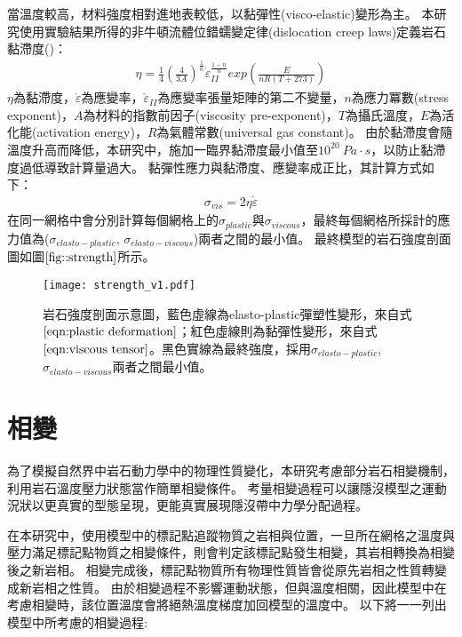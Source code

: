 當溫度較高，材料強度相對進地表較低，以黏彈性(visco-elastic)變形為主。
本研究使用實驗結果所得的非牛頓流體位錯蠕變定律(dislocation creep laws)定義岩石黏滯度(\citealp{Chen1990})：
\begin{align}
   \eta=\frac{1}{4}(\frac{4}{3A})^{\frac{1}{n}} \dot\varepsilon_{II}^{\frac{1-n}{n}} exp(\frac{E}{nR(T+273)})
   \label{eqn:viscousity}
\end{align}
$\eta$為黏滯度，$\dot\varepsilon$為應變率，$\dot\varepsilon_{II}$為應變率張量矩陣的第二不變量，$n$為應力冪數(stress exponent)，$A$為材料的指數前因子(viscosity pre-exponent)，$T$為攝氏溫度，$E$為活化能(activation energy)，$R$為氣體常數(universal gas constant)。
由於黏滯度會隨溫度升高而降低，本研究中，施加一臨界黏滯度最小值至$10^{20}\ Pa\cdot s$，以防止黏滯度過低導致計算量過大。
黏彈性應力與黏滯度、應變率成正比，其計算方式如下：	
\begin{align}
    \sigma_{vis} = 2\eta\dot\varepsilon \label{eqn:viscous tensor}
\end{align}
在同一網格中會分別計算每個網格上的$\sigma_{plastic}$與$\sigma_{viscous}$，最終每個網格所採計的應力值為($\sigma_{elasto-plastic}$, $\sigma_{elasto-viscous}$)兩者之間的最小值。
最終模型的岩石強度剖面圖如圖$\ref{fig::strength}$所示。
\begin{figure*}[ht!]
    \centering
    \texttt{[image: strength\_v1.pdf]}
    \caption[岩石強度剖面示意圖]{岩石強度剖面示意圖，藍色虛線為elasto-plastic彈塑性變形，來自式$\ref{eqn:plastic deformation}$；紅色虛線則為黏彈性變形，來自式$\ref{eqn:viscous tensor}$。黑色實線為最終強度，採用$\sigma_{elasto-plastic}$, $\sigma_{elasto-viscous}$兩者之間最小值。}
    \label{fig::strength}
\end{figure*}

\section{相變}\label{相變}

為了模擬自然界中岩石動力學中的物理性質變化，本研究考慮部分岩石相變機制，利用岩石溫度壓力狀態當作簡單相變條件。
考量相變過程可以讓隱沒模型之運動況狀以更真實的型態呈現，更能真實展現隱沒帶中力學分配過程。

在本研究中，使用模型中的標記點追蹤物質之岩相與位置，一旦所在網格之溫度與壓力滿足標記點物質之相變條件，則會判定該標記點發生相變，其岩相轉換為相變後之新岩相。
相變完成後，標記點物質所有物理性質皆會從原先岩相之性質轉變成新岩相之性質。
由於相變過程不影響運動狀態，但與溫度相關，因此模型中在考慮相變時，該位置溫度會將絕熱溫度梯度加回模型的溫度中。
以下將一一列出模型中所考慮的相變過程:

